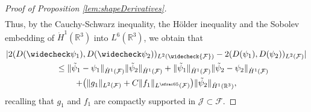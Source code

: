 \documentclass[10pt]{amsart}
\newcommand{\R}{\mathbb{R}}
\theoremstyle{definition}
\theoremstyle{remark}
\begin{document}
\begin{proof}[Proof of Proposition \ref{lem:shapeDerivatives}]
\begin{align*}
\end{align*}
Thus, by the Cauchy-Schwarz inequality, the Hölder inequality and the Sobolev embedding of $\dot H^1 (\R^3)$ into $L^6 (\R^3)$, we obtain that
\begin{multline} \label{midi1}
|2(D(\widecheck \psi_1), D(\widecheck \psi_2))_{L^2(\widecheck{\mathcal F})} - 2(D(\psi_1), D(\psi_2))_{L^2(\mathcal F)}|\\
\hspace*{.6cm}\leq \|\tilde \psi_1 - \psi_1\|_{\dot H^1(\mathcal F)} \|\tilde \psi_2\|_{\dot H^1(\mathcal F)} + \|\tilde \psi_1\|_{\dot H^1(\mathcal F)} \|\tilde \psi_2 - \psi_2\|_{\dot H^1(\mathcal F)}\\
+ \bigl(\|g_1\|_{L^2(\mathcal F)} + C \|f_1\|_{L^{\sfrac 6 5 }(\mathcal F)}\bigr) \|\tilde \psi_2\|_{\dot H^1 (\R^3)},
\end{multline}
recalling that $g_1$ and $f_1$ are compactly supported in $ \mathcal J \subset \mathcal F$.


\end{proof}
\end{document}
